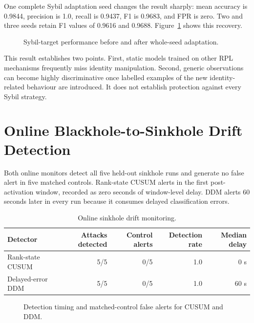 One complete Sybil adaptation seed changes the result sharply: mean accuracy is 0.9844, precision is 1.0, recall is 0.9437, F1 is 0.9683, and FPR is zero. Two and three seeds retain F1 values of 0.9616 and 0.9688. Figure~\ref{fig:sybil-adaptation} shows this recovery.

\begin{figure}[H]
\centering

\caption{Sybil-target performance before and after whole-seed adaptation.}
\label{fig:sybil-adaptation}
\end{figure}

This result establishes two points. First, static models trained on other RPL mechanisms frequently miss identity manipulation. Second, generic observations can become highly discriminative once labelled examples of the new identity-related behaviour are introduced. It does not establish protection against every Sybil strategy.

\section{Online Blackhole-to-Sinkhole Drift Detection}

Both online monitors detect all five held-out sinkhole runs and generate no false alert in five matched controls. Rank-state CUSUM alerts in the first post-activation window, recorded as zero seconds of window-level delay. DDM alerts 60 seconds later in every run because it consumes delayed classification errors.

\begin{table}[H]
\centering
\caption{Online sinkhole drift monitoring.}
\label{tab:online-drift}
\begin{tabular}{lrrrr}
\toprule
Detector & Attacks detected & Control alerts & Detection rate & Median delay \\
\midrule
Rank-state CUSUM & 5/5 & 0/5 & 1.0 & 0 s \\
Delayed-error DDM & 5/5 & 0/5 & 1.0 & 60 s \\
\bottomrule
\end{tabular}
\end{table}

\begin{figure}[H]
\centering

\caption{Detection timing and matched-control false alerts for CUSUM and DDM.}
\label{fig:online-drift}
\end{figure}

